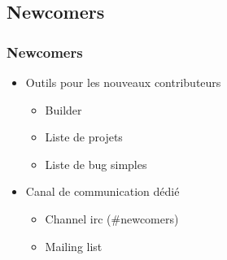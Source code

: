\documentclass{beamer}
\begin{document}
\begin{frame}

\end{frame}

\subsection{Newcomers}
\begin{frame}
  \frametitle{Newcomers}
  \begin{itemize}
  \item Outils pour les nouveaux contributeurs
    \begin{itemize}
    \item Builder
    \item Liste de projets
    \item Liste de bug simples
    \end{itemize}
  \item Canal de communication dédié
    \begin{itemize}
    \item Channel irc (\#newcomers)
    \item Mailing list
    \end{itemize}
  \end{itemize}
\end{frame}
\end{document}
